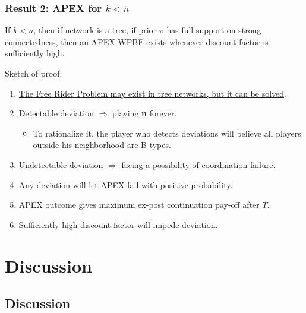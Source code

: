 \documentclass[9pt,handout]{beamer}
\begin{document}
\begin{frame}
\frametitle{Result 2: APEX for $k<n$}
\begin{theorem}[\alert{$k< n$}]
If $k<n$, then if network is a \alert{tree}, if prior $\pi$ has \alert{full support on strong connectedness}, then an APEX WPBE {exists} whenever discount factor is sufficiently high.
\end{theorem}

Sketch of proof:
\begin{enumerate}
\item \underline{The Free Rider Problem may exist in tree networks, but it can be solved}.
\item Detectable deviation $\Rightarrow$ playing \textbf{n} forever.
\begin{itemize}
\item To rationalize it, the player who detects deviations will believe all players outside his neighborhood are B-types.
\end{itemize}
\item Undetectable deviation $\Rightarrow$ facing a possibility of coordination failure.
\item Any deviation will let APEX fail with positive probability.
\item APEX outcome gives maximum ex-post continuation pay-off after $T$.
\item Sufficiently high discount factor will impede deviation.
\end{enumerate}



\end{frame}


\section{Discussion}
\subsection{Discussion}
\end{document}
